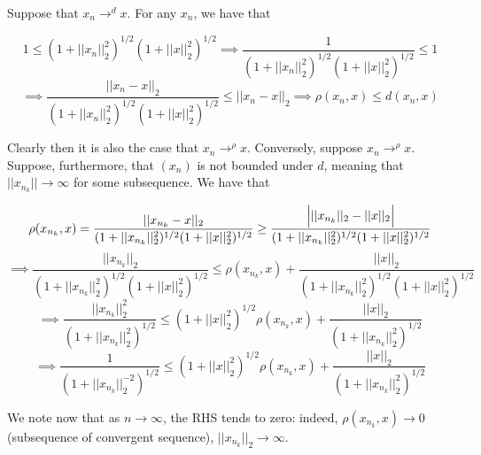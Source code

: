 \begin{solution}
    
    Suppose that $x_n \rightarrow^{d} x$.
    For any $x_n$, we have that

    \[1 \leq (1 + \lvert \lvert x_n \rvert \rvert_2^2)^{1/2}(1 + \lvert \lvert x \rvert \rvert_2^2)^{1/2} \implies \frac{1}{(1 + \lvert \lvert x_n \rvert \rvert_2^2)^{1/2}(1 + \lvert \lvert x \rvert \rvert_2^2)^{1/2}} \leq 1\]
    \[\implies \frac{\lvert \lvert x_n - x \rvert \rvert_2}{(1 + \lvert \lvert x_n \rvert \rvert_2^2)^{1/2}(1 + \lvert \lvert x \rvert \rvert_2^2)^{1/2}} \leq \lvert \lvert x_n - x \rvert \rvert_2 \implies \rho(x_n, x) \leq d(x_n, x)\]

    Clearly then it is also the case that $x_n \rightarrow^{\rho} x$.
    Conversely, suppose $x_n \rightarrow^{\rho} x$.
    Suppose, furthermore, that $(x_n)$ is not bounded under $d$, meaning that $\lvert \lvert x_{n_k} \rvert \rvert \rightarrow \infty$ for some subsequence.
    We have that

    \[
    \rho(x_{n_k}, x) = \frac{\lvert \lvert x_{n_k} - x \rvert \rvert_2}{(1 + \lvert \lvert x_{n_k} \rvert \rvert_2^2)^{1/2}(1 + \lvert \lvert x \rvert \rvert_2^2)^{1/2}} \geq \frac{\Bigl\vert \lvert \lvert x_{n_k} \rvert \rvert_2 - \lvert \lvert x \rvert \rvert_2 \Bigr\vert}{(1 + \lvert \lvert x_{n_k} \rvert \rvert_2^2)^{1/2}(1 + \lvert \lvert x \rvert \rvert_2^2)^{1/2}}
    \] 
    \[
    \implies \frac{\lvert \lvert x_{n_k} \rvert \rvert_2}{(1 + \lvert \lvert x_{n_k} \rvert \rvert_2^2)^{1/2}(1 + \lvert \lvert x \rvert \rvert_2^2)^{1/2}} \leq \rho(x_{n_k}, x) + \frac{\lvert \lvert x \rvert \rvert_2}{(1 + \lvert \lvert x_{n_k} \rvert \rvert_2^2)^{1/2}(1 + \lvert \lvert x \rvert \rvert_2^2)^{1/2}}
    \]
    \[
    \implies \frac{\lvert \lvert x_{n_k} \rvert \rvert_2^2}{(1 + \lvert \lvert x_{n_k} \rvert \rvert_2^2)^{1/2}} \leq (1 + \lvert \lvert x \rvert \rvert_2^2)^{1/2}\rho(x_{n_k}, x) + \frac{\lvert \lvert x \rvert \rvert_2}{(1 + \lvert \lvert x_{n_k} \rvert \rvert_2^2)^{1/2}}
    \]
    \[
    \implies \frac{1}{(1 + \lvert \lvert x_{n_k} \rvert \rvert_2^{-2})^{1/2}} \leq (1 + \lvert \lvert x \rvert \rvert_2^2)^{1/2}\rho(x_{n_k}, x) + \frac{\lvert \lvert x \rvert \rvert_2}{(1 + \lvert \lvert x_{n_k} \rvert \rvert_2^2)^{1/2}}
    \]

    We note now that as $n \rightarrow \infty$, the RHS tends to zero: indeed, $\rho(x_{n_k}, x) \rightarrow 0$ (subsequence of convergent sequence), $\lvert \lvert x_{n_k} \rvert \rvert_2 \rightarrow \infty$.


\end{solution}
